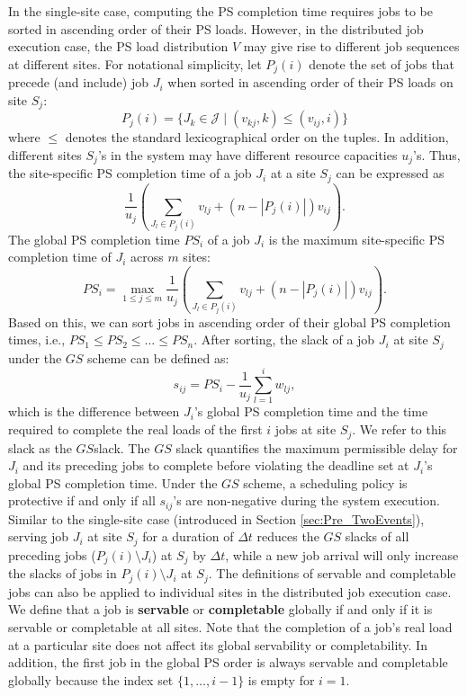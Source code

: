 In the single-site case, computing the PS completion time requires jobs to be sorted in ascending order of their PS loads. However, in the distributed job execution case, the PS load distribution $V$ may give rise to different job sequences at different sites. For notational simplicity, let $P_j(i)$ denote the set of jobs that precede (and include) job $J_i$ when sorted in ascending order of their PS loads on site $S_j$:
\begin{equation}
    \label{eq:P_j(i)}
    P_j(i) = \bigl\{ J_k \in \mathcal{J} \;\big|\; (v_{kj}, k) \le (v_{ij}, i) \bigr\}
\end{equation}
where $\le$ denotes the standard lexicographical order on the tuples. In addition, different sites $S_j$'s in the system may have different resource capacities $u_j$'s. Thus, the site-specific PS completion time of a job $J_i$ at a site $S_j$ can be expressed as
\begin{equation}
    \frac{1}{u_j}\left(\sum_{J_l \in P_j(i)}v_{lj} + (n - |P_j(i)|)v_{ij} \right).
\end{equation}
The global PS completion time $PS_i$ of a job $J_i$ is the maximum site-specific PS completion time of $J_i$ across $m$ sites:
\begin{equation}
    PS_i = \max_{1\le j \le m} \frac{1}{u_j}\left(\sum_{J_l \in P_j(i)}v_{lj} + (n - |P_j(i)|)v_{ij}\right).
\end{equation}
Based on this, we can sort jobs in ascending order of their global PS completion times, i.e., $PS_1 \le PS_2 \le \dots \le PS_n$. After sorting, the slack of a job $J_i$ at site $S_j$ under the $GS$ scheme can be defined as:
\begin{equation}
    s_{ij} = PS_i - \frac{1}{u_j}\sum_{l=1}^i w_{lj},
\end{equation}
which is the difference between $J_i$'s global PS completion time and the time required to complete the real loads of the first $i$ jobs at site $S_j$. We refer to this slack as the $GS $slack. The $GS$ slack quantifies the maximum permissible delay for $J_i$ and its preceding jobs to complete before violating the deadline set at $J_i$'s global PS completion time. Under the $GS$ scheme, a scheduling policy is protective if and only if all $s_{ij}$'s are non-negative during the system execution. Similar to the single-site case (introduced in Section \ref{sec:Pre_TwoEvents}), serving job $J_i$ at site $S_j$ for a duration of $\Delta t$ reduces the $GS$ slacks of all preceding jobs ($P_j(i)\setminus J_i$) at $S_j$ by $\Delta t$, while a new job arrival will only increase the slacks of jobs in $P_j(i)\setminus J_i$ at $S_j$. The definitions of servable and completable jobs can also be applied to individual sites in the distributed job execution case. We define that a job is \textbf{servable} or \textbf{completable} globally if and only if it is servable or completable at all sites. Note that the completion of a job's real load at a particular site does not affect its global servability or completability. In addition, the first job in the global PS order is always servable and completable globally because the index set $\{1, \dots, i-1\}$ is empty for $i = 1$.

